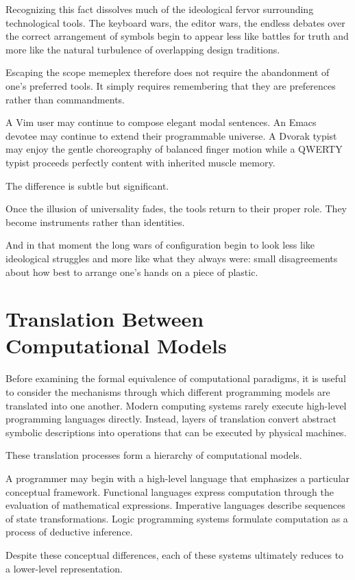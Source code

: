 \documentclass[11pt]{article}
\theoremstyle{definition}
\begin{document}
Recognizing this fact dissolves much of the ideological fervor
surrounding technological tools. The keyboard wars, the editor wars,
the endless debates over the correct arrangement of symbols begin to
appear less like battles for truth and more like the natural turbulence
of overlapping design traditions.

Escaping the scope memeplex therefore does not require the abandonment
of one's preferred tools. It simply requires remembering that they are
preferences rather than commandments.

A Vim user may continue to compose elegant modal sentences. An Emacs
devotee may continue to extend their programmable universe. A Dvorak
typist may enjoy the gentle choreography of balanced finger motion while
a QWERTY typist proceeds perfectly content with inherited muscle memory.

The difference is subtle but significant.

Once the illusion of universality fades, the tools return to their
proper role. They become instruments rather than identities.

And in that moment the long wars of configuration begin to look less
like ideological struggles and more like what they always were: small
disagreements about how best to arrange one's hands on a piece of
plastic.

\section{Translation Between Computational Models}

Before examining the formal equivalence of computational paradigms, it
is useful to consider the mechanisms through which different
programming models are translated into one another. Modern computing
systems rarely execute high-level programming languages directly.
Instead, layers of translation convert abstract symbolic descriptions
into operations that can be executed by physical machines.

These translation processes form a hierarchy of computational models.

A programmer may begin with a high-level language that emphasizes a
particular conceptual framework. Functional languages express
computation through the evaluation of mathematical expressions.
Imperative languages describe sequences of state transformations.
Logic programming systems formulate computation as a process of
deductive inference.

Despite these conceptual differences, each of these systems ultimately
reduces to a lower-level representation.
\end{document}
